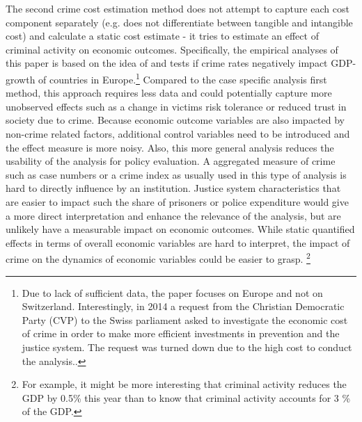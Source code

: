 \documentclass[a4paper,12pt]{article}
\begin{document}
The second crime cost estimation method does not attempt to capture each cost component separately (e.g. does not differentiate between tangible and intangible cost) and calculate a static cost estimate - it tries to estimate an effect of criminal activity on economic outcomes.
Specifically, the empirical analyses of this paper is based on the idea of \citep{entorf} and tests if crime rates negatively impact GDP-growth of countries in Europe.\footnote{Due to lack of sufficient data, the paper focuses on Europe and not on Switzerland.
Interestingly, in 2014 a request from the Christian Democratic Party (CVP) to the Swiss parliament asked to investigate the economic cost of crime in order to make more efficient investments in prevention and the justice system. The request was turned down due to the high cost to conduct the analysis.\citep{postulat}.}
Compared to the case specific analysis first method, this approach requires less data and could potentially capture more unobserved effects such as a change in victims risk tolerance or reduced trust in society due to crime.
Because economic outcome variables are also impacted by non-crime related factors, additional control variables need to be introduced and the effect measure is more noisy. 
Also, this more general analysis reduces the usability of the analysis for policy evaluation. A aggregated measure of crime such as case numbers or a crime index as usually used in this type of analysis is hard to directly influence by an institution. Justice system characteristics that are easier to impact such the share of prisoners or police expenditure would give a more direct interpretation and enhance the relevance of the analysis, but are unlikely have a measurable impact on economic outcomes. While static quantified effects in terms of overall economic variables are hard to interpret, the impact of crime on the dynamics of economic variables could be easier to grasp. \footnote{For example, it might be more interesting that criminal activity reduces the GDP by 0.5\% this year than to know that criminal activity accounts for 3 \% of the GDP.} 
\end{document}
